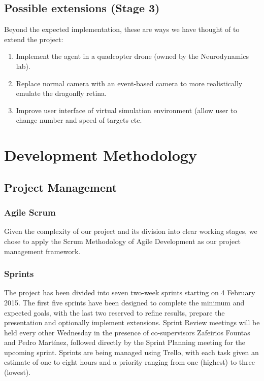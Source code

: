 \documentclass[a4paper,11pt]{article}
\begin{document}
 	\subsection{Possible extensions (Stage 3)}
 	
 	Beyond the expected implementation, these are ways we have thought of to extend the project:
 \begin{enumerate}
 	\item Implement the agent in a quadcopter drone (owned by the Neurodynamics lab).
 	\item Replace normal camera with an event-based camera to more realistically emulate the dragonfly retina.
 	\item Improve user interface of virtual simulation environment (allow user to change number and speed of targets etc. 
 \end{enumerate}

\section{Development Methodology}

\subsection{Project Management}

\subsubsection{Agile Scrum}

Given the complexity of our project and its division into clear working stages, we chose to apply the Scrum Methodology of Agile Development as our project management framework.

\subsubsection{Sprints}
The project has been divided into seven two-week sprints starting on 4 February 2015. The first five sprints have been designed to complete the minimum and expected goals, with the last two reserved to refine results, prepare the presentation and optionally implement extensions. Sprint Review meetings will be held every other Wednesday in the presence of co-supervisors Zafeirios Fountas and Pedro Martínez, followed directly by the Sprint Planning meeting for the upcoming sprint. Sprints are being managed using Trello, with each task given an estimate of one to eight hours and a priority ranging from one (highest) to three (lowest).
\end{document}
